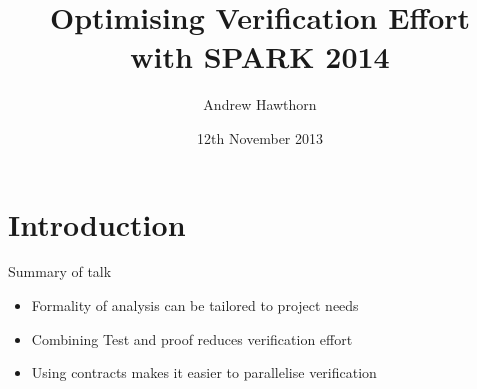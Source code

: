 \documentclass{beamer}
\title{Optimising Verification Effort\\with SPARK 2014}
\subtitle{Andrew Hawthorn}
\date{12th November 2013}
\begin{document}
\begin{altrantitle}
\end{altrantitle}


\makeatletter
\newenvironment{btHighlight}[1][]
{\begingroup\tikzset{bt@Highlight@par/.style={#1}}\begin{lrbox}{\@tempboxa}}
{\end{lrbox}\bt@HL@box[bt@Highlight@par]{\@tempboxa}\endgroup}

\newcommand\btHL[1][]{%
  \begin{btHighlight}[#1]\bgroup\aftergroup\bt@HL@endenv%
}
\def\bt@HL@endenv{%
  \end{btHighlight}%
  \egroup
}
\newcommand{\bt@HL@box}[2][]{%
  \tikz[remember picture]{%
    \pgfpathrectangle{\pgfpoint{1pt}{0pt}}{\pgfpoint{\wd #2}{\ht #2}}%
    \pgfusepath{use as bounding box}%
    \node[anchor=base west,%
          outer sep=0pt,%
          inner xsep=1pt,%
          inner ysep=0pt,%
          rounded corners=2pt,%
          minimum height=\ht\strutbox+1pt,%
          #1]%
          {%
            \raisebox{1pt}{\strut}\strut\usebox{#2}%
          };%
  }%
}
\makeatother

\section{Introduction}

\begin{frame}[fragile]{Summary of talk}
  \begin{itemize}
  \item Formality of analysis can be tailored to project needs
  \item Combining Test and proof reduces verification effort
  \item Using contracts makes it easier to parallelise verification
  \end{itemize}
\end{frame}
\end{document}
